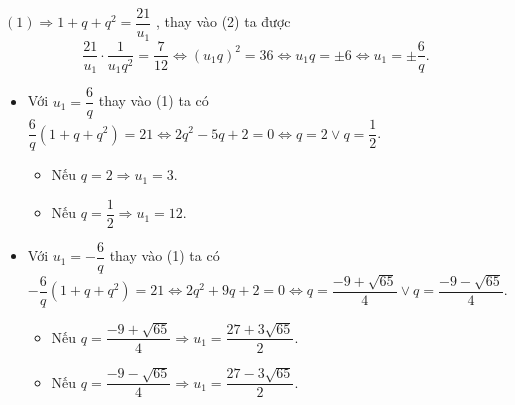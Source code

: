 \begin{vd}
{\begin{enumerate}
			$(1)\Rightarrow 1+q+q^2=\dfrac{21}{u_1}$ , thay vào (2) ta được $$\dfrac{21}{u_1}\cdot\dfrac{1}{u_1q^2}=\dfrac{7}{12}\Leftrightarrow{\left(u_1q\right)^2}=36\Leftrightarrow u_1q=\pm 6\Leftrightarrow u_1=\pm \dfrac{6}{q}.$$
			\begin{itemize}
				\item Với $u_1=\dfrac{6}{q}$ thay vào (1) ta có \\ $\dfrac{6}{q}\left(1+q+q^2\right)=21\Leftrightarrow 2q^2-5q+2=0\Leftrightarrow q=2 \vee q=\dfrac{1}{2}$.
				\begin{itemize}
					\item Nếu $q=2\Rightarrow{u_1}=3$.
					\item Nếu $q=\dfrac{1}{2}\Rightarrow{u_1}=12$.
				\end{itemize}
				\item Với $u_1=-\dfrac{6}{q}$ thay vào (1) ta có \\ $-\dfrac{6}{q}\left(1+q+q^2\right)=21\Leftrightarrow 2q^2+9q+2=0\Leftrightarrow q=\dfrac{-9+\sqrt{65}}{4}\vee q=\dfrac{-9-\sqrt{65}}{4}$.
				\begin{itemize}
					\item Nếu $q=\dfrac{-9+\sqrt{65}}{4}\Rightarrow{u_1}=\dfrac{27+3\sqrt{65}}{2}$.
					\item Nếu $q=\dfrac{-9-\sqrt{65}}{4}\Rightarrow{u_1}=\dfrac{27-3\sqrt{65}}{2}$. 
				\end{itemize}
				

\end{itemize}
\end{enumerate}}
\end{vd}
